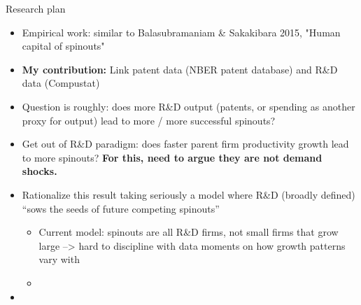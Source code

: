 \documentclass[english,usenames,dvipsnames]{beamer}
\begin{document}
\begin{frame}{Research plan}
\begin{itemize}
	\small
	\item Empirical work: similar to Balasubramaniam \& Sakakibara 2015, "Human capital of spinouts" 
	\item \textbf{My contribution: } Link patent data (NBER patent database) and R\&D data (Compustat)
	\item Question is roughly: does more R\&D output (patents, or spending as another proxy for output) lead to more / more successful spinouts?
	\item Get out of R\&D paradigm: does faster parent firm productivity growth lead to more spinouts? \textbf{For this, need to argue they are not demand shocks.}
	\item Rationalize this result taking seriously a model where R\&D (broadly defined) ``sows the seeds of future competing spinouts'' 
	\begin{itemize}
		\item Current model: spinouts are all R\&D firms, not small firms that grow large --> hard to discipline with data moments on how growth patterns vary with 
		\item  
	\end{itemize}
	\item 
\end{itemize}
\end{frame}
\end{document}
